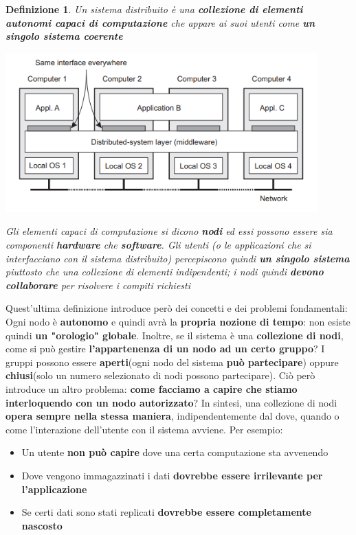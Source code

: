 \documentclass[12pt]{article}
\newtheorem{Definizione}{Definizione}[subsection]
\begin{document}
\begin{Definizione}
    Un sistema distribuito è una \textbf{collezione di elementi autonomi capaci di computazione} che appare ai suoi utenti come \textbf{un singolo sistema coerente}
    \begin{center}
        \includegraphics[width = 0.90\textwidth]{Images/2.PNG}
    \end{center}
    Gli elementi capaci di computazione si dicono \textbf{nodi} ed essi possono essere sia componenti \textbf{hardware} che \textbf{software}. \newline
    Gli utenti (o le applicazioni che si interfacciano con il sistema distribuito) percepiscono quindi \textbf{un singolo sistema} piuttosto che una collezione di elementi indipendenti; i nodi quindi \textbf{devono collaborare} per risolvere i compiti richiesti
\end{Definizione}
Quest'ultima definizione introduce però dei concetti e dei problemi fondamentali: \newline
Ogni nodo è \textbf{autonomo} e quindi avrà la \textbf{propria nozione di tempo}: non esiste quindi \textbf{un "orologio" globale}. \newline
Inoltre, se il sistema è una \textbf{collezione di nodi}, come si può gestire \textbf{l'appartenenza di un nodo ad un certo gruppo}? I gruppi possono essere \textbf{aperti}(ogni nodo del sistema \textbf{può partecipare}) oppure \textbf{chiusi}(solo un numero selezionato di nodi possono partecipare). Ciò però introduce un altro problema: \textbf{come facciamo a capire che stiamo interloquendo con un nodo autorizzato}? \newline
In sintesi, una collezione di nodi \textbf{opera sempre nella stessa maniera}, indipendentemente dal dove, quando o come l'interazione dell'utente con il sistema avviene. \newline
Per esempio:
\begin{itemize}
    \item Un utente \textbf{non può capire} dove una certa computazione sta avvenendo
    \item Dove vengono immagazzinati i dati \textbf{dovrebbe essere irrilevante per l'applicazione}
    \item Se certi dati sono stati replicati \textbf{dovrebbe essere completamente nascosto}
\end{itemize}
\end{document}
